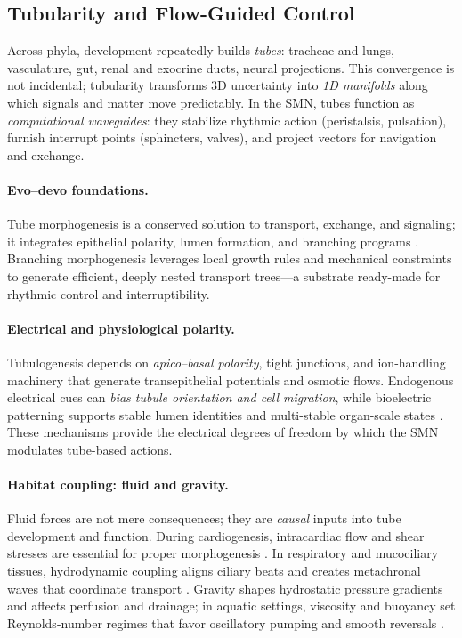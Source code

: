 
\subsection{Tubularity and Flow-Guided Control}
\label{subsec:tubular}

Across phyla, development repeatedly builds \emph{tubes}: tracheae and lungs, vasculature, gut, renal and exocrine ducts, neural projections.
This convergence is not incidental; tubularity transforms 3D uncertainty into \emph{1D manifolds} along which signals and matter move predictably.
In the SMN, tubes function as \emph{computational waveguides}: they stabilize rhythmic action (peristalsis, pulsation), furnish interrupt points (sphincters, valves), and project vectors for navigation and exchange.

\paragraph{Evo--devo foundations.}
Tube morphogenesis is a conserved solution to transport, exchange, and signaling; it integrates epithelial polarity, lumen formation, and branching programs \cite{LubarskyKrasnow2003TubeMorphogenesis,AffolterZellerCaussinus2009Branching,VarnerNelson2014Branching}.
Branching morphogenesis leverages local growth rules and mechanical constraints to generate efficient, deeply nested transport trees---a substrate ready-made for rhythmic control and interruptibility.

\paragraph{Electrical and physiological polarity.}
Tubulogenesis depends on \emph{apico--basal polarity}, tight junctions, and ion-handling machinery that generate transepithelial potentials and osmotic flows.
Endogenous electrical cues can \emph{bias tubule orientation and cell migration}, while bioelectric patterning supports stable lumen identities and multi-stable organ-scale states \cite{McCaigRajnicekSongZhao2005ElecControl,Levin2014MolecularBioelectricity}.
These mechanisms provide the electrical degrees of freedom by which the SMN modulates tube-based actions.

\paragraph{Habitat coupling: fluid and gravity.}
Fluid forces are not mere consequences; they are \emph{causal} inputs into tube development and function.
During cardiogenesis, intracardiac flow and shear stresses are essential for proper morphogenesis \cite{HoveKoster2003CardioFlow}.
In respiratory and mucociliary tissues, hydrodynamic coupling aligns ciliary beats and creates metachronal waves that coordinate transport \cite{GuiraoJoanny2007CiliaFlow}.
Gravity shapes hydrostatic pressure gradients and affects perfusion and drainage; in aquatic settings, viscosity and buoyancy set Reynolds-number regimes that favor oscillatory pumping and smooth reversals \cite{Vogel1994LifeInMovingFluids}.

